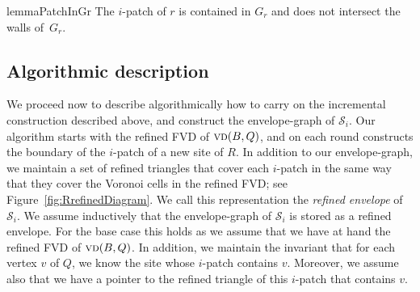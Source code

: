 \documentclass[a4paper,UKenglish]{socg-lipics-v2018}
\newcommand{\icell}[1][i]{${#1}$-patch\xspace}
\newcommand{\icells}[1][i]{${#1}$-patches\xspace}
\newcommand{\s}{\mathcal S}
\newcommand{\p}[3][P]{\ensuremath{\pi_{_{#1}}(#2, #3)}}
\newcommand{\vd}[2][P]{\textsc{vd}(#2, #1)}
\begin{document}
\begin{restatable}{lemma}{PatchInGr}\label{lemma: Patch in G_r}
The \icell of $r$ is contained in $G_r$ and does not intersect the walls of~$G_r$.
\end{restatable}
\newcommand{\ProofPatchInGr}{
\PatchInGr*
\begin{proof}
Because $f_r$ is only defined in $G_r$, we get trivially that the \icell of $r$ is contained in $G_r$. To prove the second part of the result,
recall that the walls of $G_r$ are defined by the paths $\p{r}{u_r}$ and $\p{r}{v_r}$, where $u_r$ and $v_r$ lie strictly inside of the Voronoi cells of some blue sites (see Section~\ref{sec: Preprocessing of red sites}).
By Lemma~\ref{lemma:Patch contains vcell}, we know then that $u_r$ and $v_r$ lie strictly inside the \icells of some blue sites in $B$.
Therefore, if there was a point of the \icell of $r$ on any of the walls of $G_r$, say on $\p{r}{u_r}$, then by Lemma~\ref{lemma:Shadow points} $u_r$ would belong to the \icell of $r$---a contradiction as $u_r$ lies strictly inside the \icell of a blue site. 
\end{proof}
}




\subsection{Algorithmic description} 

We proceed now to describe algorithmically how to carry on the incremental construction described above, and construct the envelope-graph of $\s_i$.
Our algorithm starts with the refined FVD of $\vd[Q]{B}$, and on each round constructs the boundary of the \icell of a new site of $R$. 
In addition to our envelope-graph, we maintain a set of refined triangles that cover each \icell in the same way that they cover the Voronoi cells in the refined FVD; see Figure~\ref{fig:RrefinedDiagram}.
We call this representation the \emph{refined envelope} of $\s_i$.
We assume inductively that the envelope-graph of $\s_i$ is stored as a refined envelope. 
For the base case this holds as we assume that we have at hand the refined FVD of $\vd[Q]{B}$.
In addition, we maintain the invariant that for each vertex $v$ of $Q$, we know the site whose \icell contains $v$. 
Moreover, we assume also that we have a pointer to the refined triangle of this \icell that contains $v$.
\end{document}
